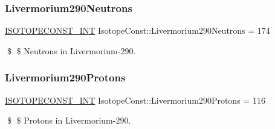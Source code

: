 \subsubsection{\texorpdfstring{Livermorium290\+Neutrons}{Livermorium290Neutrons}}
{\footnotesize\ttfamily \mbox{\hyperlink{group___isotope_const-_macros_ga5f18360b3e99483a35c32d789e62621c}{I\+S\+O\+T\+O\+P\+E\+C\+O\+N\+S\+T\+\_\+\+I\+NT}} Isotope\+Const\+::\+Livermorium290\+Neutrons = 174}

\$ \$ Neutrons in Livermorium-\/290. \mbox{\label{group___isotope_const-_livermorium-_lv290_gaa3b1ca9d9ed4288f37d73a43d2e60243}} 
\subsubsection{\texorpdfstring{Livermorium290\+Protons}{Livermorium290Protons}}
{\footnotesize\ttfamily \mbox{\hyperlink{group___isotope_const-_macros_ga5f18360b3e99483a35c32d789e62621c}{I\+S\+O\+T\+O\+P\+E\+C\+O\+N\+S\+T\+\_\+\+I\+NT}} Isotope\+Const\+::\+Livermorium290\+Protons = 116}

\$ \$ Protons in Livermorium-\/290. 